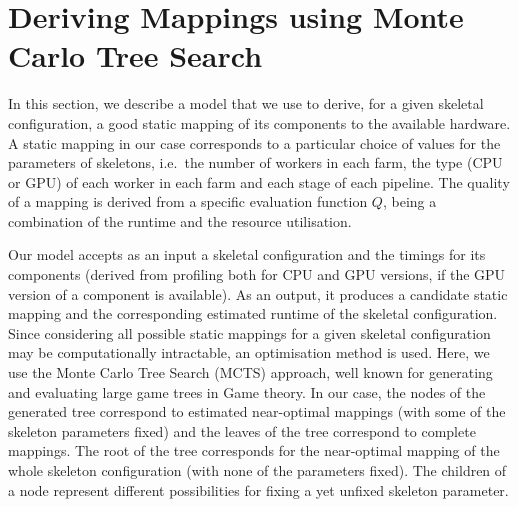 \documentclass[smallextended]{svjour3}
\begin{document}



\section{Deriving Mappings using Monte Carlo Tree Search}
\noindent
In this section, we describe a model that we use to derive, for a
given skeletal configuration, a good  static mapping of its components to
the available hardware. A static mapping in our case corresponds to a
particular choice of values for the parameters of skeletons, i.e.\ the number of workers in
each farm, the type (CPU or GPU) of each worker in each farm and each stage of each pipeline. 
The quality of a mapping is derived from a specific evaluation function $Q$, being a combination of the runtime and the resource utilisation. 

Our model accepts as an input a skeletal configuration and
the timings for its components (derived from profiling both for CPU and
GPU versions, if the GPU version of a component is available). As an
output, it produces a candidate static mapping  and the corresponding estimated runtime of the skeletal
configuration. Since considering all possible static mappings for a given
skeletal configuration may be computationally intractable, an optimisation method is used. Here, we use the Monte Carlo Tree Search (MCTS) approach, well known for generating and
evaluating large game trees in Game theory. In our case,  the nodes of the
generated tree correspond to estimated near-optimal mappings (with some of the
skeleton parameters fixed) and the leaves of the tree correspond to
complete mappings. The root of the tree corresponds for the
near-optimal mapping of the whole skeleton configuration (with none of
the parameters fixed). The children of a node represent different
possibilities for fixing a yet unfixed skeleton parameter.
\end{document}
